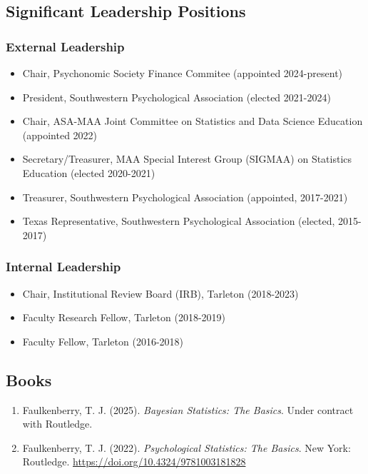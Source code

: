 \documentclass[article,10pt]{article}
\begin{document}
\subsection*{Significant Leadership Positions}
\label{sec:org75c1614}
\subsubsection*{External Leadership}
\label{sec:org2ca1786}

\begin{itemize}
\item Chair, Psychonomic Society Finance Commitee (appointed 2024-present)
\item President, Southwestern Psychological Association (elected 2021-2024)
\item Chair, ASA-MAA Joint Committee on Statistics and Data Science Education (appointed 2022)
\item Secretary/Treasurer, MAA Special Interest Group (SIGMAA) on Statistics Education (elected 2020-2021)
\item Treasurer, Southwestern Psychological Association (appointed, 2017-2021)
\item Texas Representative, Southwestern Psychological Association (elected, 2015-2017)
\end{itemize}

\subsubsection*{Internal Leadership}
\label{sec:org35af932}

\begin{itemize}
\item Chair, Institutional Review Board (IRB), Tarleton (2018-2023)
\item Faculty Research Fellow, Tarleton (2018-2019)
\item Faculty Fellow, Tarleton (2016-2018)
\end{itemize}

\subsection*{Books}
\label{sec:org4df8961}
\begin{enumerate}
\item Faulkenberry, T. J. (2025). \emph{Bayesian Statistics: The Basics}. Under contract with Routledge.
\item Faulkenberry, T. J. (2022). \emph{Psychological Statistics: The Basics}. New York: Routledge. \url{https://doi.org/10.4324/9781003181828}
\end{enumerate}
\end{document}
